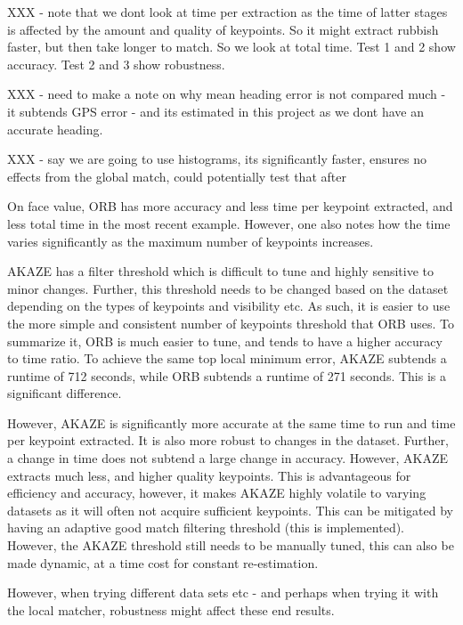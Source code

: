 \begin{itemize}
XXX - note that we dont look at time per extraction as the time of latter stages is affected by the amount and quality of keypoints. So it might extract rubbish faster, but then take longer to match. So we look at total time.
Test 1 and 2 show accuracy. Test 2 and 3 show robustness. 

XXX - need to make a note on why mean heading error is not compared much - it subtends GPS error - and its estimated in this project as we dont have an accurate heading. 

XXX - say we are going to use histograms, its significantly faster, ensures no effects from the global match, could potentially test that after 







On face value, ORB has more accuracy and less time per keypoint extracted, and less total time in the most recent example. However, one also notes how the time varies significantly as the maximum number of keypoints increases. 

AKAZE has a filter threshold which is difficult to tune and highly sensitive to minor changes. Further, this threshold needs to be changed based on the dataset depending on the types of keypoints and visibility etc. As such, it is easier to use the more simple and consistent number of keypoints threshold that ORB uses. To summarize it, ORB is much easier to tune, and tends to have a higher accuracy to time ratio. To achieve the same top local minimum error, AKAZE subtends a runtime of 712 seconds, while ORB subtends a runtime of 271 seconds. This is a significant difference. 

However, AKAZE is significantly more accurate at the same time to run and time per keypoint extracted. It is also more robust to changes in the dataset. Further, a change in time does not subtend a large change in accuracy. However, AKAZE extracts much less, and higher quality keypoints. This is advantageous for efficiency and accuracy, however, it makes AKAZE highly volatile to varying datasets as it will often not acquire sufficient keypoints. This can be mitigated by having an adaptive good match filtering threshold (this is implemented). However, the AKAZE threshold still needs to be manually tuned, this can also be made dynamic, at a time cost for constant re-estimation. 

However, when trying different data sets etc - and perhaps when trying it with the local matcher, robustness might affect these end results. 






\end{itemize}
